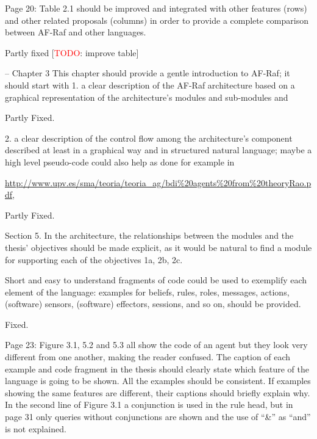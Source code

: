 \documentclass{article}
\newcommand{\todo}[1]{[\textcolor{red}{TODO}: #1]}
\newenvironment{them}{\noindent\begingroup\color{blue}}{\endgroup\par}
\begin{document}
\begin{them}
Page 20:
Table 2.1 should be improved and integrated with other features (rows) and other related proposals
(columns) in order to provide a complete comparison between AF-Raf and other languages.
\end{them}
Partly fixed
\todo{improve table}

\begin{them}
-- Chapter 3
This chapter should provide a gentle introduction to AF-Raf; it should start with
1. a clear description of the AF-Raf architecture based on a graphical representation of the
architecture's modules and sub-modules and
\end{them}
Partly Fixed. 

\begin{them}
2. a clear description of the control flow among the architecture's component described at least in a
graphical way and in structured natural language; maybe a high level pseudo-code could also help as
done for example in

\url{http://www.upv.es/sma/teoria/teoria_ag/bdi\%20agents\%20from\%20theoryRao.pdf},
\end{them}
Partly Fixed. 

\begin{them}
Section 5.
In the architecture, the relationships between the modules and the thesis' objectives should be made explicit, as it would be natural to find a module for supporting each of the objectives 1a, 2b, 2c.
\end{them}
\todo{} 

\begin{them}
Short and easy to understand fragments of code could be used to exemplify each element of the language: examples for beliefs, rules, roles, messages, actions, (software) sensors, (software) effectors, sessions, and so on, should be provided.
\end{them}
Fixed. 

\begin{them}
Page 23:
Figure 3.1, 5.2 and 5.3 all show the code of an agent but they look very different from one another, making the reader confused. The caption of each example and code fragment in the thesis should clearly state which feature of the language is going to be shown. All the examples should be consistent. If examples showing the same features are different, their captions should briefly explain why.
In the second line of Figure 3.1 a conjunction is used in the rule head, but in page 31 only queries without conjunctions are shown and the use of “\&” as “and” is not explained.
\end{them}
\todo{} 
\end{document}
